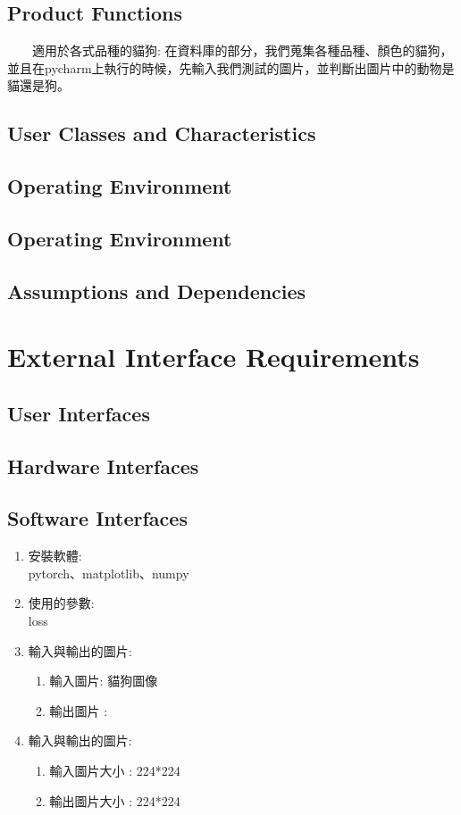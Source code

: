 \documentclass{scrreprt}
\begin{document}
\begin{CJK*}{UTF8}{bsmi}
\section{Product Functions}
　　適用於各式品種的貓狗: 在資料庫的部分，我們蒐集各種品種、顏色的貓狗，並且在pycharm上執行的時候，先輸入我們測試的圖片，並判斷出圖片中的動物是貓還是狗。

\section{User Classes and Characteristics}


\section{Operating Environment}


\section{Operating Environment}


\section{Assumptions and Dependencies}




\chapter{External Interface Requirements}

\section{User Interfaces}


\section{Hardware Interfaces}


\section{Software Interfaces}
\begin{enumerate}
	\item 安裝軟體:\\pytorch、matplotlib、numpy
	\item 使用的參數:\\loss
	\item 輸入與輸出的圖片:
	\begin{enumerate}
		\item 輸入圖片:  貓狗圖像
		\item 輸出圖片 : 
	\end{enumerate}
	\item 輸入與輸出的圖片:
	\begin{enumerate}
		\item 輸入圖片大小 :  224*224
		\item 輸出圖片大小 :  224*224 
	\end{enumerate}
\end{enumerate}




\end{CJK*}
\end{document}
